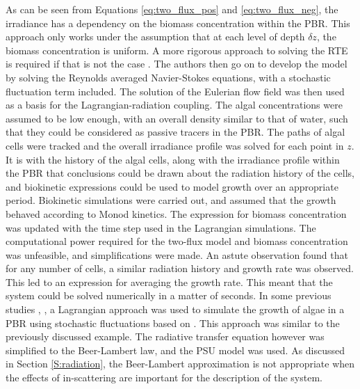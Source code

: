 As can be seen from Equations \ref{eq:two_flux_pos} and \ref{eq:two_flux_neg}, the irradiance has a dependency on the biomass concentration within the PBR. This approach only works under the assumption that at each level of depth $\delta z$, the biomass concentration is uniform. A more rigorous approach to solving the RTE is required if that is not the case \cite{pruvost2008}. The authors then go on to develop the model by solving the Reynolds averaged Navier-Stokes equations, with a stochastic fluctuation term included. The solution of the Eulerian flow field was then used as a basis for the Lagrangian-radiation coupling. The algal concentrations were assumed to be low enough, with an overall density similar to that of water, such that they could be considered as passive tracers in the PBR. The paths of algal cells were tracked and the overall irradiance profile was solved for each point in $z$. It is with the history of the algal cells, along with the irradiance profile within the PBR that conclusions could be drawn about the radiation history of the cells, and biokinetic expressions could be used to model growth over an appropriate period. Biokinetic simulations were carried out, and assumed that the growth behaved according to Monod kinetics. The expression for biomass concentration was updated with the time step used in the Lagrangian simulations. The computational power required for the two-flux model and biomass concentration was unfeasible, and simplifications were made. An astute observation found that for any number of cells, a similar radiation history and growth rate was observed. This led to an expression for averaging the growth rate. This meant that the system could be solved numerically in a matter of seconds. In some previous studies \cite{marshall2011}, \cite{marschall2012}, a Lagrangian approach was used to simulate the growth of algae in a PBR using stochastic fluctuations based on \cite{thomson1987}. This approach was similar to the previously discussed example. The radiative transfer equation however was simplified to the Beer-Lambert law, and the PSU model \cite{eilers1988} was used. As discussed in Section \ref{S:radiation}, the Beer-Lambert approximation is not appropriate when the effects of in-scattering are important for the description of the system. 


